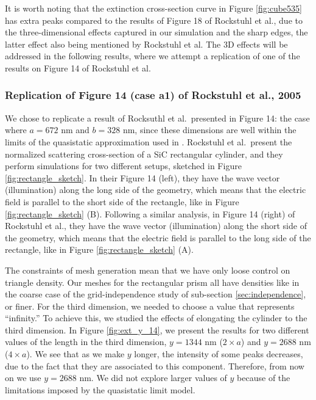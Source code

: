 It is worth noting that the extinction cross-section curve in Figure \ref{fig:cube535} has extra peaks 
compared to the results of Figure 18 of Rockstuhl et al., due to the three-dimensional effects captured in our simulation and the sharp 
edges, the latter effect also being mentioned by Rockstuhl et al. The 3D effects will be addressed
in the following results, where we attempt a replication of one of the results on Figure 14 of Rockstuhl et al. 

\subsubsection{Replication of Figure 14 (case a1) of Rockstuhl et al., 2005}

We chose to replicate a result of Rocksuthl et al.\ presented in Figure 14: 
the case where $a=672$ nm 
and $b=328$ nm, since these dimensions are well within the limits of the quasistatic approximation 
used in \pygbe. Rockstuhl et al.\ present the normalized scattering cross-section of a SiC rectangular 
cylinder, and they perform simulations for two different setups, sketched in Figure \ref{fig:rectangle_sketch}. In 
their Figure 14 (left), they have the wave vector (illumination) along the long 
side of the geometry, which means that the electric field is parallel to the short side of the rectangle, like in 
Figure \ref{fig:rectangle_sketch} (B). Following a similar analysis, in Figure 14 (right) of Rockstuhl et al., they have the wave 
vector (illumination) along the short side of the geometry, which means that the electric field is parallel to the 
long side of the rectangle, like in Figure \ref{fig:rectangle_sketch} (A). 

The constraints of mesh generation mean that we have only loose control on triangle density. Our meshes for the rectangular prism all have densities like in the coarse case of the grid-independence study of sub-section \ref{sec:independence}, or finer.
For the third dimension, we needed to choose a value that represents ``infinity.'' To achieve this, we studied the effects of 
elongating the cylinder to the third dimension. In Figure \ref{fig:ext_y_14}, we present the results for two different
values of the length in the third dimension, $y=1344$ nm ($2\times a$) and $y=2688$ nm ($4\times a$). We see that as we make $y$ longer, the 
intensity of some peaks decreases, due to the fact that they are associated to this component. Therefore, 
from now on we use $y=2688$ nm. We did not explore larger values of $y$ because of the limitations imposed by the quasistatic limit model.



